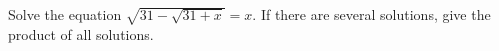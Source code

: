 Solve the equation $\sqrt{31-\sqrt{31+x}}=x$. If there are several solutions, give the product of all solutions.
